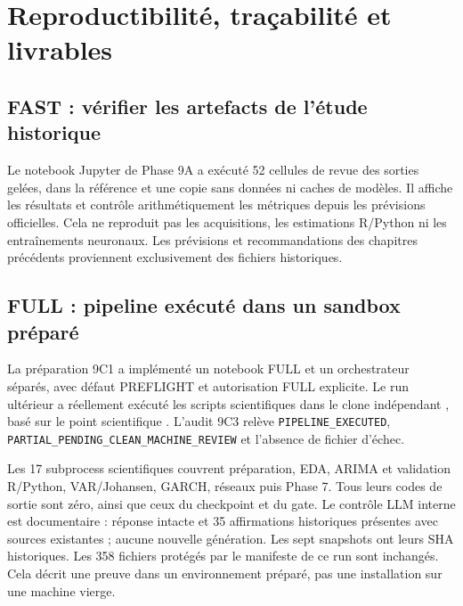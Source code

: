 \section{Reproductibilité, traçabilité et livrables}
\label{sec:reproduction}
\subsection{FAST : vérifier les artefacts de l'étude historique}
Le notebook Jupyter de Phase 9A a exécuté 52 cellules de revue des sorties gelées,
dans la référence et une copie sans données ni caches de modèles. Il affiche les
résultats et contrôle arithmétiquement les métriques depuis les prévisions
officielles. Cela ne reproduit pas les acquisitions, les estimations R/Python ni
les entraînements neuronaux. Les prévisions et recommandations des chapitres
précédents proviennent exclusivement des fichiers historiques.

\subsection{FULL : pipeline exécuté dans un sandbox préparé}
La préparation 9C1 a implémenté un notebook FULL et un orchestrateur séparés,
avec défaut PREFLIGHT et autorisation FULL explicite. Le run ultérieur a
réellement exécuté les scripts scientifiques dans le clone indépendant
, basé sur le point scientifique
.
L'audit 9C3 relève \texttt{PIPELINE\_EXECUTED},
\texttt{PARTIAL\_PENDING\_CLEAN\_MACHINE\_REVIEW} et l'absence de fichier d'échec.

Les 17 subprocess scientifiques couvrent préparation, EDA, ARIMA et validation
R/Python, VAR/Johansen, GARCH, réseaux puis Phase 7. Tous leurs codes de sortie
sont zéro, ainsi que ceux du checkpoint et du gate. Le contrôle LLM interne est
documentaire : réponse intacte et 35 affirmations historiques présentes avec
sources existantes ; aucune nouvelle génération.
Les sept snapshots ont leurs SHA historiques. Les 358 fichiers protégés par le
manifeste de ce run sont inchangés. Cela décrit une preuve dans un environnement
préparé, pas une installation sur une machine vierge.

